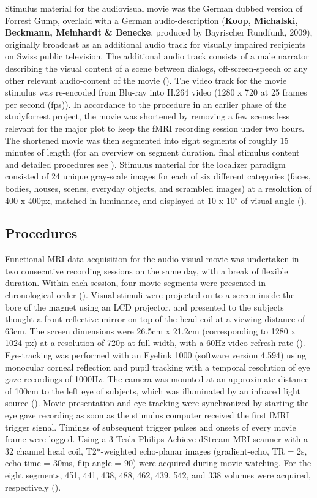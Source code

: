 \documentclass[a4paper, 12pt]{scrreprt}
\begin{document}
Stimulus material for the audiovisual movie was the German dubbed version of Forrest Gump, overlaid with a German audio-description (\textbf{Koop, Michalski, Beckmann, Meinhardt \& Benecke}, produced by Bayrischer Rundfunk, 2009), originally broadcast as an additional audio track for visually impaired recipients on Swiss public television. The additional audio track consists of a male narrator describing the visual content of a scene between dialogs, off-screen-speech or any other relevant audio-content of the movie (\cite{hanke2014high}). The video track for the movie stimulus was re-encoded from Blu-ray into H.264 video (1280 x 720 at 25 frames per second (fps)). In accordance to the procedure in an earlier phase of the studyforrest project, the movie was shortened by removing a few scenes less relevant for the major plot to keep the fMRI recording session under two hours. The shortened movie was then segmented into eight segments of roughly 15 minutes of length (for an overview on segment duration, final stimulus content and detailed procedures see \textcite{hanke2014high}). Stimulus material for the localizer paradigm consisted of 24 unique gray-scale images for each of six different categories (faces, bodies, houses, scenes, everyday objects, and scrambled images) at a resolution of 400 x 400px, matched in luminance, and displayed at 10 x 10$^\circ$ of visual angle (\cite{sengupta2016studyforrest}).


\subsection{Procedures}
Functional MRI data acquisition for the audio visual movie was undertaken in two consecutive recording sessions on the same day, with a break of flexible duration. Within each session, four movie segments were presented in chronological order (\cite{hanke2016studyforrest}). Visual stimuli were projected on to a screen inside the bore of the magnet using an LCD projector, and presented to the subjects thought a front-reflective mirror on top of the head coil at a viewing distance of 63cm. The screen dimensions were 26.5cm x 21.2cm (corresponding to 1280 x 1024 px) at a resolution of 720p at full width, with a 60Hz video refresh rate (\cite{sengupta2016studyforrest}). Eye-tracking was performed with an Eyelink 1000 (software version 4.594) using monocular corneal reflection and pupil tracking with a temporal resolution of eye gaze recordings of 1000Hz. The camera was mounted at an approximate distance of 100cm to the left eye of subjects, which was illuminated
by an infrared light source (\cite{hanke2016studyforrest}). Movie presentation and eye-tracking were synchronized by starting the eye gaze recording as soon as the stimulus computer received the first fMRI trigger signal. Timings of subsequent trigger pulses and onsets of every movie frame
were logged. Using a 3 Tesla Philips Achieve dStream MRI scanner with a 32 channel head coil, T2*-weighted echo-planar images (gradient-echo, TR = 2s, echo time = 30ms, flip angle = 90) were acquired during movie watching. For the eight segments, 451, 441, 438, 488, 462, 439, 542, and 338 volumes were acquired, respectively (\cite{hanke2016studyforrest}).\newline
\end{document}
